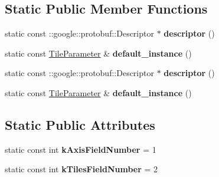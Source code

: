\subsection*{Static Public Member Functions}
\begin{DoxyCompactItemize}
\item 
\mbox{\label{classcaffe_1_1_tile_parameter_a2f63bb9fa39f1dcf09ede800ba01a68c}} 
static const \+::google\+::protobuf\+::\+Descriptor $\ast$ {\bfseries descriptor} ()
\item 
\mbox{\label{classcaffe_1_1_tile_parameter_a6734cb846f993d07f55014b404b23865}} 
static const \mbox{\hyperlink{classcaffe_1_1_tile_parameter}{Tile\+Parameter}} \& {\bfseries default\+\_\+instance} ()
\item 
\mbox{\label{classcaffe_1_1_tile_parameter_a729157381f8120b40f1bc50f2cfa3d2e}} 
static const \+::google\+::protobuf\+::\+Descriptor $\ast$ {\bfseries descriptor} ()
\item 
\mbox{\label{classcaffe_1_1_tile_parameter_acb117e0852e1bd4a96cd40696e97c97a}} 
static const \mbox{\hyperlink{classcaffe_1_1_tile_parameter}{Tile\+Parameter}} \& {\bfseries default\+\_\+instance} ()
\end{DoxyCompactItemize}
\subsection*{Static Public Attributes}
\begin{DoxyCompactItemize}
\item 
\mbox{\label{classcaffe_1_1_tile_parameter_aa85458b1b134f1f832018b0178452caa}} 
static const int {\bfseries k\+Axis\+Field\+Number} = 1
\item 
\mbox{\label{classcaffe_1_1_tile_parameter_a3a0b6df5a94b19ed42c6d1f4044f5258}} 
static const int {\bfseries k\+Tiles\+Field\+Number} = 2
\end{DoxyCompactItemize}
